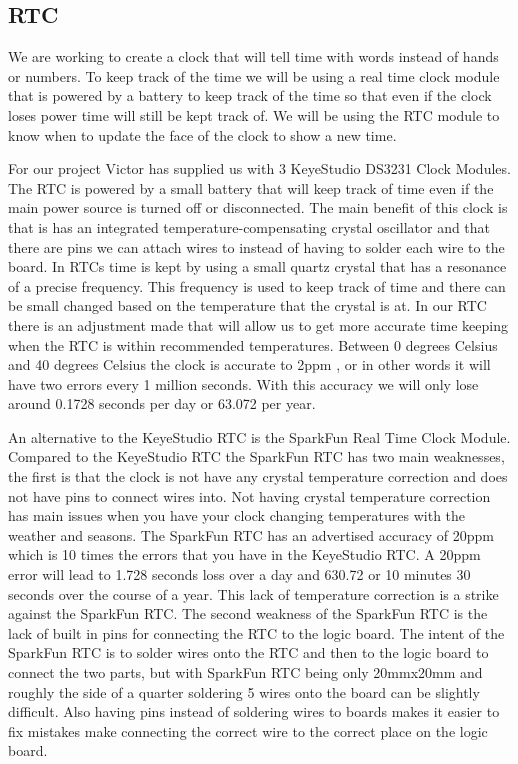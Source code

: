 \documentclass[onecolumn, draftclsnofoot,10pt, compsoc]{IEEEtran}
\begin{document}
\subsection{RTC}
We are working to create a clock that will tell time with words instead of hands or numbers.
To keep track of the time we will be using a real time clock module that is powered by a battery to keep track of the time so that even if the clock loses power time will still be kept track of.
We will be using the RTC module to know when to update the face of the clock to show a new time.

For our project Victor has supplied us with 3 KeyeStudio DS3231 Clock Modules.
The RTC is powered by a small battery that will keep track of time even if the main power source is turned off or disconnected.
The main benefit of this clock is that is has an integrated temperature-compensating crystal oscillator and that there are pins we can attach wires to instead of having to solder each wire to the board.
In RTCs time is kept by using a small quartz crystal that has a resonance of a precise frequency.
This frequency is used to keep track of time and there can be small changed based on the temperature that the crystal is at.
In our RTC there is an adjustment made that will allow us to get more accurate time keeping when the RTC is within recommended temperatures.
Between 0 degrees Celsius and 40 degrees Celsius the clock is accurate to 2ppm \cite{ksRTC}, or in other words it will have two errors every 1 million seconds.
With this accuracy we will only lose around 0.1728 seconds per day or 63.072 per year.

An alternative to the KeyeStudio RTC is the SparkFun Real Time Clock Module.
Compared to the KeyeStudio RTC the SparkFun RTC has two main weaknesses, the first is that the clock is not have any crystal temperature correction and does not have pins to connect wires into.
Not having crystal temperature correction has main issues when you have your clock changing temperatures with the weather and seasons.
The SparkFun RTC has an advertised accuracy of 20ppm which is 10 times the errors that you have in the KeyeStudio RTC.
A 20ppm error will lead to 1.728 seconds loss over a day and 630.72 or 10 minutes 30 seconds over the course of a year.
This lack of temperature correction is a strike against the SparkFun RTC.
The second weakness of the SparkFun RTC is the lack of built in pins for connecting the RTC to the logic board.
The intent of the SparkFun RTC is to solder wires onto the RTC and then to the logic board to connect the two parts, but with SparkFun RTC being only 20mmx20mm and roughly the side of a quarter \cite{sfRTC} soldering 5 wires onto the board can be slightly difficult.
Also having pins instead of soldering wires to boards makes it easier to fix mistakes make connecting the correct wire to the correct place on the logic board.
\end{document}
